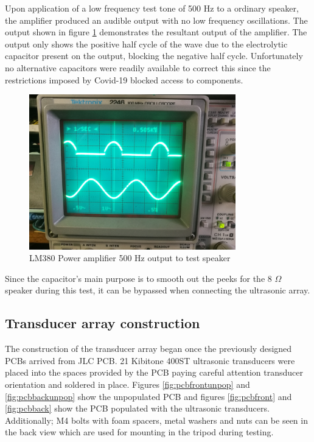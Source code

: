 Upon application of a low frequency test tone of 500 Hz to a ordinary speaker, the amplifier produced an audible output with no low frequency oscillations. The output shown in figure \ref{fig:ampOscOut} demonstrates the resultant output of the amplifier. The output only shows the positive half cycle of the wave due to the electrolytic capacitor present on the output, blocking the negative half cycle. Unfortunately no alternative capacitors were readily available to correct this since the restrictions imposed by Covid-19 blocked access to components.
\begin{figure}[ht!]
    \centering
    \includegraphics[width=0.8\textwidth]{Figures/Implementation/Amplifier/ampOutbb.jpg}
    \caption{LM380 Power amplifier 500 Hz output to test speaker}
    \label{fig:ampOscOut}
\end{figure}
Since the capacitor's main purpose is to smooth out the peeks for the 8 $\Omega$ speaker during this test, it can be bypassed when connecting the ultrasonic array.


\newpage
\subsection{Transducer array construction}
The construction of the transducer array began once the previously designed PCBs arrived from JLC PCB. 21 Kibitone 400ST ultrasonic transducers were placed into the spaces provided by the PCB paying careful attention transducer orientation and soldered in place. Figures \ref{fig:pcbfrontunpop} and \ref{fig:pcbbackunpop} show the unpopulated PCB and figures \ref{fig:pcbfront} and \ref{fig:pcbback} show the PCB populated with the ultrasonic transducers. Additionally; M4 bolts with foam spacers, metal washers and nuts can be seen in the back view which are used for mounting in the tripod during testing.

